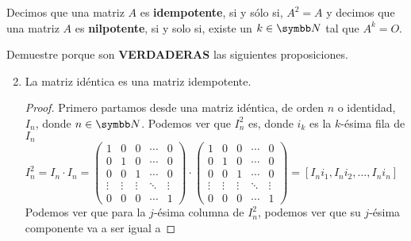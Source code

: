 \pagebreak
\begin{definition}
    Decimos que una matriz \(A\) es \textbf{idempotente}, si y sólo si, \(A^2 = A\) y decimos que una matriz \(A\) es \textbf{nilpotente},
    si y solo si, existe un \(k \in \realN\) tal que \(A^k = O\).
\end{definition}
\item Demuestre porque son \textbf{VERDADERAS} las siguientes proposiciones.
    \begin{enumerate}[label=\listAlph]
        \setcounter{enumii}{1}
        \item La matriz idéntica es una matriz idempotente.
            \begin{proof}
                Primero partamos desde una matriz idéntica, de orden \(n\) o identidad, \(I_n\), donde \(n \in \realN\).
                Podemos ver que \(I_n^2\) es, donde \(i_k\) es la \(k\)-ésima fila de \(I_n\)
                \[
                    I_n^2 = I_n \cdot I_n = 
                    \begin{pmatrix}
                        1 & 0 & 0 & \cdots & 0 \\ 
                        0 & 1 & 0 & \cdots & 0 \\ 
                        0 & 0 & 1 & \cdots & 0 \\ 
                        \vdots & \vdots & \vdots & \ddots & \vdots \\
                        0 & 0 & 0 & \cdots & 1
                    \end{pmatrix}
                    \cdot 
                    \begin{pmatrix}
                        1 & 0 & 0 & \cdots & 0 \\ 
                        0 & 1 & 0 & \cdots & 0 \\ 
                        0 & 0 & 1 & \cdots & 0 \\ 
                        \vdots & \vdots & \vdots & \ddots & \vdots \\
                        0 & 0 & 0 & \cdots & 1
                    \end{pmatrix}
                    =
                    \left[I_n i_1, I_n i_2, \ldots, I_n i_n\right]
                    \hspace{1cm}
                \]
                Podemos ver que para la \(j\)-ésima columna de \(I_n^2\), podemos ver que su \(j\)-ésima componente va a ser igual a

\end{proof}
\end{enumerate}
